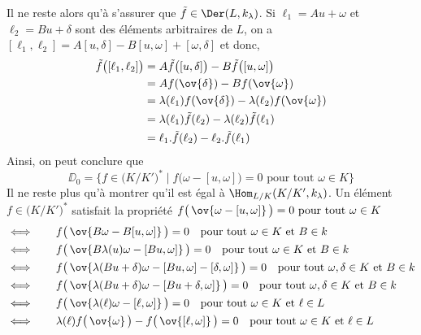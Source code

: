 \begin{Prop}
\begin{pre}
Il ne reste alors qu'à s'assurer que $\tilde{f} \in \Der(L,k_\lambda)$. Si $\ell_1 = Au + \omega$ et $\ell_2 = Bu + \delta$ sont des éléments arbitraires de $L$, on a $[\ell_1,\ell_2] = A[u,\delta] - B[u,\omega] + [\omega,\delta]$ et donc, 
\begin{align*}
\tilde{f}\big([\ell_1,\ell_2]\big) &= A\tilde{f}\big([u,\delta]\big) - B\tilde{f}\big([u,\omega]\big)\\
&= Af(\ov{\delta}) - Bf(\ov{\omega})\\
&= \lambda(\ell_1)f(\ov{\delta}) - \lambda(\ell_2)f(\ov{\omega})\\
&= \lambda(\ell_1)\tilde{f}(\ell_2) - \lambda(\ell_2)\tilde{f}(\ell_1)\\
&= \ell_1.\tilde{f}(\ell_2) - \ell_2.\tilde{f}(\ell_1)
\end{align*}
Ainsi, on peut conclure que 
$$ \DD_0 = \Big\{f \in \big(K / K'\big)^* \; | \; f\big(\omega - [u,\omega]\big) = 0 \text{ pour tout } \omega \in K \Big\} $$ 
Il ne reste plus qu'à montrer qu'il est égal à $\Hom_{L/K}(K/K',k_\lambda)$. Un élément $f \in \big(K / K'\big)^*$ satisfait la propriété $f\big(\,\ov{\omega - [u,\omega]}\,\big) = 0 \text{ pour tout } \omega \in K$
\begin{align*}
&\Longleftrightarrow \qquad f\big(\,\ov{B\omega - B[u,\omega]}\,\big) = 0 \quad \text{pour tout } \omega \in K \text{ et } B \in k\\
&\Longleftrightarrow \qquad f\big(\,\ov{B\lambda(u)\omega - [Bu,\omega]}\,\big) = 0 \quad \text{pour tout } \omega \in K \text{ et } B \in k\\
&\Longleftrightarrow \qquad f\big(\,\ov{\lambda(Bu + \delta)\omega - [Bu,\omega]-[\delta,\omega]}\,\big) = 0 \quad \text{pour tout } \omega,\delta \in K \text{ et } B \in k\\
&\Longleftrightarrow \qquad f\big(\,\ov{\lambda(Bu + \delta)\omega - [Bu + \delta,\omega]}\,\big) = 0 \quad \text{pour tout } \omega,\delta \in K \text{ et } B \in k\\
&\Longleftrightarrow \qquad f\big(\,\ov{\lambda(\ell)\omega - [\ell,\omega]}\,\big) = 0 \quad \text{pour tout } \omega \in K \text{ et } \ell \in L\\
&\Longleftrightarrow \qquad \lambda(\ell)f\big(\,\ov{\omega}\,\big) - f\big(\,\ov{[\ell,\omega]}\,\big) = 0 \quad \text{pour tout } \omega \in K \text{ et } \ell \in L\\

\end{align*}
\end{pre}
\end{Prop}
